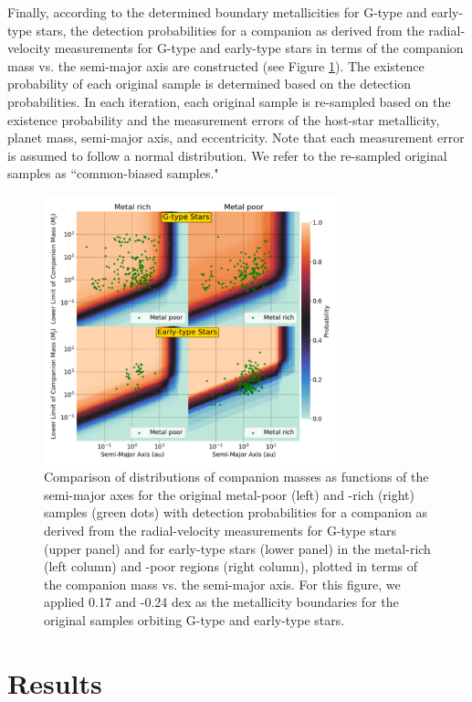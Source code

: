 \documentclass[twocolumn]{aastex62}
\begin{document}
\begin{CJK*}{UTF8}{min}
Finally, according to the determined boundary metallicities for G-type and early-type stars, the detection probabilities for a companion as derived from the radial-velocity measurements for G-type and early-type stars in terms of the companion mass vs. the semi-major axis are constructed (see Figure \ref{fig:bias}). The existence probability of each original sample is determined based on the detection probabilities. In each iteration, each original sample is re-sampled based on the existence probability and the measurement errors of the host-star metallicity, planet mass, semi-major axis, and eccentricity. Note that each measurement error is assumed to follow a normal distribution. We refer to the re-sampled original samples as ``common-biased samples." 

\begin{figure}
\centering
\includegraphics[width=8.5cm]{bias_sep.pdf}
\caption{Comparison of distributions of companion masses as functions of the semi-major axes for the original metal-poor (left) and -rich (right) samples (green dots) with detection probabilities for a companion as derived from the radial-velocity measurements for G-type stars (upper panel) and for early-type stars (lower panel) in the metal-rich (left column) and -poor regions (right column), plotted in terms of the companion mass vs. the semi-major axis. For this figure, we applied 0.17 and -0.24 dex as the metallicity boundaries for the original samples orbiting G-type and early-type stars.}
\label{fig:bias}
\end{figure}


\section{Results} \label{sec:results}


\end{CJK*}
\end{document}
